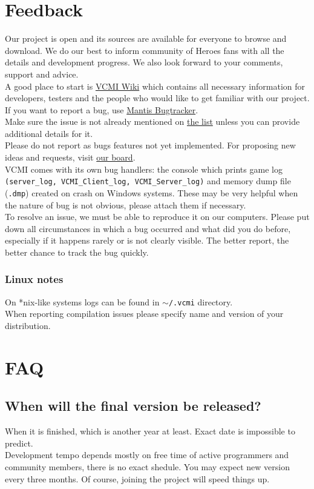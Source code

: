 \documentclass[a4size,final]{article}
\begin{document}
\section{Feedback}
Our project is open and its sources are available for everyone to browse and download. We do our best to inform community of Heroes fans with all the details and development progress. We also look forward to your comments, support and advice.\medskip\\
A good place to start is \href{http://wiki.vcmi.eu/index.php?title=Main_Page}{VCMI Wiki} which contains all necessary information for developers, testers and the people who would like to get familiar with our project.
If you want to report a bug, use \href{http://bugs.vcmi.eu/bug_report_advanced_page.php}{Mantis Bugtracker}.\\
Make sure the issue is not already mentioned on \href{http://bugs.vcmi.eu/view_all_bug_page.php}{the list} unless you can provide additional details for it.\\
Please do not report as bugs features not yet implemented. For proposing new ideas and requests, visit \href{http://forum.vcmi.eu/index.php}{our board}.\medskip\\
VCMI comes with its own bug handlers: the console which prints game log \texttt{(server\_log, VCMI\_Client\_log, VCMI\_Server\_log)} and memory dump file (\texttt{.dmp}) created on crash on Windows systems. These may be very helpful when the nature of bug is not obvious, please attach them if necessary.\medskip\\
To resolve an issue, we must be able to reproduce it on our computers. Please put down all circumstances in which a bug occurred and what did you do before, especially if it happens rarely or is not clearly visible. The better report, the better chance to track the bug quickly.
\subsubsection{Linux notes}
On *nix-like systems logs can be found in \texttt{$\sim$/.vcmi} directory. \\
When reporting compilation issues please specify name and version of your distribution.
\section{FAQ}
\subsection{When will the final version be released?}
When it is finished, which is another year at least. Exact date is impossible to predict.\\
Development tempo depends mostly on free time of active programmers and community members, there is no exact shedule. You may expect new version every three months. Of course, joining the project will speed things up.
\end{document}
